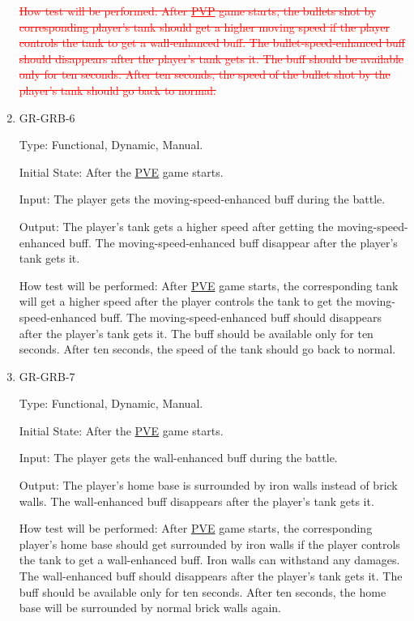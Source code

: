 \documentclass[12pt, titlepage]{article}
\begin{document}
\begin{enumerate}
\textcolor{red}{\sout{How test will be performed: After \underline{PVP} game starts, the bullets shot by corresponding player's tank should get a higher moving speed if the player controls the tank to get a wall-enhanced buff. The bullet-speed-enhanced buff should disappears after the player's tank gets it. The buff should be available only for ten seconds. After ten seconds, the speed of the bullet shot by the player's tank should go back to normal.}}

\item{GR-GRB-6\\}

Type: Functional, Dynamic, Manual.
					
Initial State: After the \underline{PVE} game starts. 
					
Input: The player gets the moving-speed-enhanced buff during the battle.
					
Output: The player's tank gets a higher speed after getting the moving-speed-enhanced buff. The moving-speed-enhanced buff disappear after the player's tank gets it.
					
How test will be performed: After \underline{PVE} game starts, the corresponding tank will get a higher speed after the player controls the tank to get the moving-speed-enhanced buff. The moving-speed-enhanced buff should disappears after the player's tank gets it. The buff should be available only for ten seconds. After ten seconds, the speed of the tank should go back to normal.

\item{GR-GRB-7\\}

Type: Functional, Dynamic, Manual.
					
Initial State: After the \underline{PVE} game starts. 
					
Input: The player gets the wall-enhanced buff during the battle.
					
Output: The player's home base is surrounded by iron walls instead of brick walls. The wall-enhanced buff disappears after the player's tank gets it.
					
How test will be performed: After \underline{PVE} game starts, the corresponding player's home base should get surrounded by iron walls if the player controls the tank to get a wall-enhanced buff. Iron walls can withstand any damages. The wall-enhanced buff should disappears after the player's tank gets it. The buff should be available only for ten seconds. After ten seconds, the home base will be surrounded by normal brick walls again.


\end{enumerate}
\end{document}

